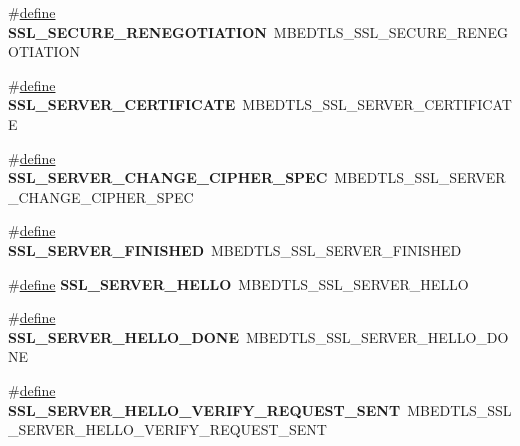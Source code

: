 \begin{DoxyCompactItemize}
\item 
\mbox{\label{compat-1_83_8h_a3b2194c4a00cf137d99c90859838c7e5}} 
\#\hyperlink{structdefine}{define} {\bfseries S\+S\+L\+\_\+\+S\+E\+C\+U\+R\+E\+\_\+\+R\+E\+N\+E\+G\+O\+T\+I\+A\+T\+I\+ON}~M\+B\+E\+D\+T\+L\+S\+\_\+\+S\+S\+L\+\_\+\+S\+E\+C\+U\+R\+E\+\_\+\+R\+E\+N\+E\+G\+O\+T\+I\+A\+T\+I\+ON
\item 
\mbox{\label{compat-1_83_8h_aa97838e8945f2d6615c6e0f5d04be715}} 
\#\hyperlink{structdefine}{define} {\bfseries S\+S\+L\+\_\+\+S\+E\+R\+V\+E\+R\+\_\+\+C\+E\+R\+T\+I\+F\+I\+C\+A\+TE}~M\+B\+E\+D\+T\+L\+S\+\_\+\+S\+S\+L\+\_\+\+S\+E\+R\+V\+E\+R\+\_\+\+C\+E\+R\+T\+I\+F\+I\+C\+A\+TE
\item 
\mbox{\label{compat-1_83_8h_a0ca383e705aaa545175827ba1cb5281d}} 
\#\hyperlink{structdefine}{define} {\bfseries S\+S\+L\+\_\+\+S\+E\+R\+V\+E\+R\+\_\+\+C\+H\+A\+N\+G\+E\+\_\+\+C\+I\+P\+H\+E\+R\+\_\+\+S\+P\+EC}~M\+B\+E\+D\+T\+L\+S\+\_\+\+S\+S\+L\+\_\+\+S\+E\+R\+V\+E\+R\+\_\+\+C\+H\+A\+N\+G\+E\+\_\+\+C\+I\+P\+H\+E\+R\+\_\+\+S\+P\+EC
\item 
\mbox{\label{compat-1_83_8h_a76a3567e1a6086c4dda7481267302af1}} 
\#\hyperlink{structdefine}{define} {\bfseries S\+S\+L\+\_\+\+S\+E\+R\+V\+E\+R\+\_\+\+F\+I\+N\+I\+S\+H\+ED}~M\+B\+E\+D\+T\+L\+S\+\_\+\+S\+S\+L\+\_\+\+S\+E\+R\+V\+E\+R\+\_\+\+F\+I\+N\+I\+S\+H\+ED
\item 
\mbox{\label{compat-1_83_8h_a0d66067badb079c2737f4bba33abeec3}} 
\#\hyperlink{structdefine}{define} {\bfseries S\+S\+L\+\_\+\+S\+E\+R\+V\+E\+R\+\_\+\+H\+E\+L\+LO}~M\+B\+E\+D\+T\+L\+S\+\_\+\+S\+S\+L\+\_\+\+S\+E\+R\+V\+E\+R\+\_\+\+H\+E\+L\+LO
\item 
\mbox{\label{compat-1_83_8h_a8aca26e17333dba32450c31f7d9fdd85}} 
\#\hyperlink{structdefine}{define} {\bfseries S\+S\+L\+\_\+\+S\+E\+R\+V\+E\+R\+\_\+\+H\+E\+L\+L\+O\+\_\+\+D\+O\+NE}~M\+B\+E\+D\+T\+L\+S\+\_\+\+S\+S\+L\+\_\+\+S\+E\+R\+V\+E\+R\+\_\+\+H\+E\+L\+L\+O\+\_\+\+D\+O\+NE
\item 
\mbox{\label{compat-1_83_8h_ae00aeb039843031549ebef1501e8a00e}} 
\#\hyperlink{structdefine}{define} {\bfseries S\+S\+L\+\_\+\+S\+E\+R\+V\+E\+R\+\_\+\+H\+E\+L\+L\+O\+\_\+\+V\+E\+R\+I\+F\+Y\+\_\+\+R\+E\+Q\+U\+E\+S\+T\+\_\+\+S\+E\+NT}~M\+B\+E\+D\+T\+L\+S\+\_\+\+S\+S\+L\+\_\+\+S\+E\+R\+V\+E\+R\+\_\+\+H\+E\+L\+L\+O\+\_\+\+V\+E\+R\+I\+F\+Y\+\_\+\+R\+E\+Q\+U\+E\+S\+T\+\_\+\+S\+E\+NT

\end{DoxyCompactItemize}
